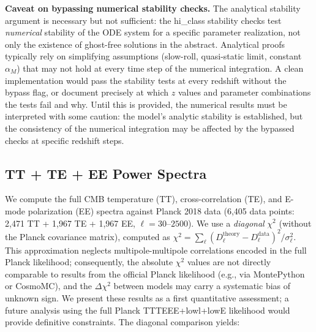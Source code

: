 \documentclass[aps,prd,twocolumn,superscriptaddress,nofootinbib]{revtex4-2}
\begin{document}
\textbf{Caveat on bypassing numerical stability checks.} The analytical stability argument is necessary but not sufficient: the hi\_class stability checks test \emph{numerical} stability of the ODE system for a specific parameter realization, not only the existence of ghost-free solutions in the abstract. Analytical proofs typically rely on simplifying assumptions (slow-roll, quasi-static limit, constant $\alpha_M$) that may not hold at every time step of the numerical integration. A clean implementation would pass the stability tests at every redshift without the bypass flag, or document precisely at which $z$ values and parameter combinations the tests fail and why. Until this is provided, the numerical results must be interpreted with some caution: the model's analytic stability is established, but the consistency of the numerical integration may be affected by the bypassed checks at specific redshift steps.

\subsection{TT + TE + EE Power Spectra}

We compute the full CMB temperature (TT), cross-correlation (TE), and E-mode polarization (EE) spectra against Planck 2018 data (6{,}405 data points: 2{,}471 TT + 1{,}967 TE + 1{,}967 EE, $\ell = 30$--$2500$). We use a \textit{diagonal} $\chi^2$ (without the Planck covariance matrix), computed as $\chi^2 = \sum_\ell (D_\ell^{\mathrm{theory}} - D_\ell^{\mathrm{data}})^2 / \sigma_\ell^2$. This approximation neglects multipole-multipole correlations encoded in the full Planck likelihood; consequently, the absolute $\chi^2$ values are not directly comparable to results from the official Planck likelihood (e.g., via MontePython or CosmoMC), and the $\Delta\chi^2$ between models may carry a systematic bias of unknown sign. We present these results as a first quantitative assessment; a future analysis using the full Planck TTTEEE+lowl+lowE likelihood would provide definitive constraints. The diagonal comparison yields:
\end{document}
